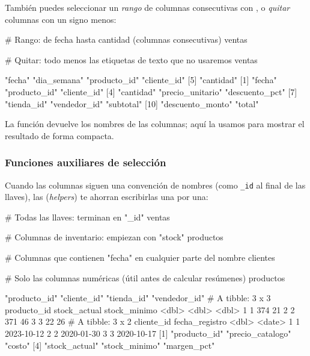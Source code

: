 También puedes seleccionar un \emph{rango} de columnas consecutivas con
\codigo{:}, o \emph{quitar} columnas con un signo menos:

\begin{rcode}
# Rango: de fecha hasta cantidad (columnas consecutivas)
ventas %

# Quitar: todo menos las etiquetas de texto que no usaremos
ventas %
\end{rcode}
\begin{rsalida}
[1] "fecha"       "dia_semana"  "producto_id" "cliente_id" 
[5] "cantidad"   
 [1] "fecha"           "producto_id"     "cliente_id"     
 [4] "cantidad"        "precio_unitario" "descuento_pct"  
 [7] "tienda_id"       "vendedor_id"     "subtotal"       
[10] "descuento_monto" "total"          
\end{rsalida}

La función  devuelve los nombres de las columnas; aquí la
usamos para mostrar el resultado de forma compacta.

\subsubsection{Funciones auxiliares de selección}

Cuando las columnas siguen una convención de nombres (como
\texttt{\_id} al final de las llaves), las 
(\emph{helpers}) te ahorran escribirlas una por una:

\begin{rcode}
# Todas las llaves: terminan en "_id"
ventas %

# Columnas de inventario: empiezan con "stock"
productos %

# Columnas que contienen "fecha" en cualquier parte del nombre
clientes %

# Solo las columnas numéricas (útil antes de calcular resúmenes)
productos %
\end{rcode}
\begin{rsalida}
[1] "producto_id" "cliente_id"  "tienda_id"   "vendedor_id"
# A tibble: 3 x 3
  producto_id stock_actual stock_minimo
        <dbl>        <dbl>        <dbl>
1           1          374           21
2           2          371           46
3           3           22           26
# A tibble: 3 x 2
  cliente_id fecha_registro
       <dbl> <date>        
1          1 2023-10-12    
2          2 2020-01-30    
3          3 2020-10-17    
[1] "producto_id"     "precio_catalogo" "costo"          
[4] "stock_actual"    "stock_minimo"    "margen_pct"     
\end{rsalida}

